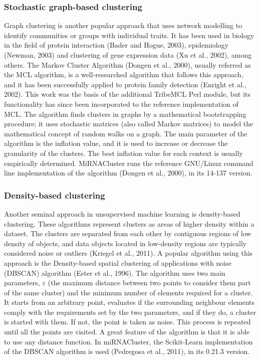 \documentclass[nocrop]{bioinfo}
\begin{document}
\begin{methods}
\subsubsection{Stochastic graph-based clustering}
Graph clustering is another popular approach that uses network modelling to identify communities or groups with individual traits. It has been used in biology in the field of protein interaction (Bader and Hogue, 2003), epidemiology (Newman, 2003) and clustering of gene expression data (Xu et al., 2002), among others. The Markov Cluster Algorithm (Dongen et al., 2000), usually referred as the MCL algorithm, is a well-researched algorithm that follows this approach, and it has been successfully applied to protein family detection (Enright et al., 2002). This work was the basis of the additional TribeMCL Perl module, but its functionality has since been incorporated to the reference implementation of MCL. The algorithm finds clusters in graphs by a mathematical bootstrapping procedure; it uses stochastic matrices (also called Markov matrices) to model the mathematical concept of random walks on a graph. The main parameter of the algorithm is the inflation value, and it is used to increase or decrease the granularity of the clusters. The best inflation value for each context is usually empirically determined. MiRNACluster runs the reference GNU/Linux command line implementation of the algorithm (Dongen et al., 2000), in its 14-137 version.

\subsubsection{Density-based clustering}
Another seminal approach in unsupervised machine learning is density-based clustering. These algorithms represent clusters as areas of higher density within a dataset. The clusters are separated from each other by contiguous regions of low density of objects, and data objects located in low-density regions are typically considered noise or outliers (Kriegel et al., 2011). A popular algorithm using this approach is the Density-based spatial clustering of applications with noise (DBSCAN) algorithm (Ester et al., 1996). The algorithm uses two main parameters, $\varepsilon$ (the maximum distance between two points to consider them part of the same cluster) and the minimum number of elements required for a cluster. It starts from an arbitrary point, evaluates if the surrounding neighbour elements comply with the requirements set by the two parameters, and if they do, a cluster is started with them. If not, the point is taken as noise. This process is repeated until all the points are visited. A great feature of the algorithm is that it is able to use any distance function. In miRNACluster, the Scikit-Learn implementation of the DBSCAN algorithm is used (Pedregosa et al., 2011), in its 0.21.3 version.


\end{methods}
\end{document}

